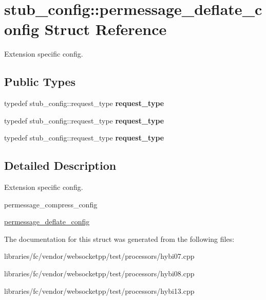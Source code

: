 \hypertarget{structstub__config_1_1permessage__deflate__config}{}\section{stub\+\_\+config\+:\+:permessage\+\_\+deflate\+\_\+config Struct Reference}
\label{structstub__config_1_1permessage__deflate__config}


Extension specific config.  


\subsection*{Public Types}
\begin{DoxyCompactItemize}
\item 
\mbox{\label{structstub__config_1_1permessage__deflate__config_a042686c4994ab829d85e953045a0bdf4}} 
typedef stub\+\_\+config\+::request\+\_\+type {\bfseries request\+\_\+type}
\item 
\mbox{\label{structstub__config_1_1permessage__deflate__config_a042686c4994ab829d85e953045a0bdf4}} 
typedef stub\+\_\+config\+::request\+\_\+type {\bfseries request\+\_\+type}
\item 
\mbox{\label{structstub__config_1_1permessage__deflate__config_a042686c4994ab829d85e953045a0bdf4}} 
typedef stub\+\_\+config\+::request\+\_\+type {\bfseries request\+\_\+type}
\end{DoxyCompactItemize}


\subsection{Detailed Description}
Extension specific config. 

permessage\+\_\+compress\+\_\+config

\mbox{\hyperlink{structstub__config_1_1permessage__deflate__config}{permessage\+\_\+deflate\+\_\+config}} 

The documentation for this struct was generated from the following files\+:\begin{DoxyCompactItemize}
\item 
libraries/fc/vendor/websocketpp/test/processors/hybi07.\+cpp\item 
libraries/fc/vendor/websocketpp/test/processors/hybi08.\+cpp\item 
libraries/fc/vendor/websocketpp/test/processors/hybi13.\+cpp\end{DoxyCompactItemize}
